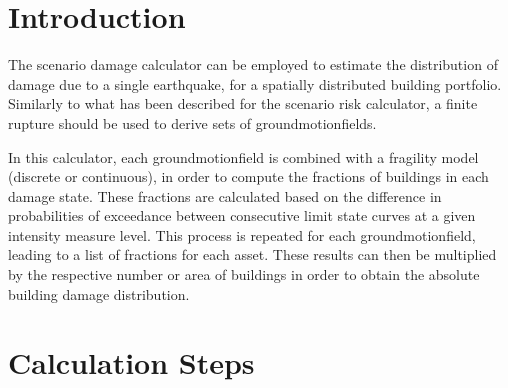 

\section{Introduction}
The scenario damage calculator can be employed to estimate the distribution of damage due to a single earthquake, for a spatially distributed building portfolio. Similarly to what has been described for the scenario risk calculator, a finite \gls{rupture} should be used to derive sets of \glspl{groundmotionfield}. 

In this calculator, each \gls{groundmotionfield} is combined with a \gls{fragility model} (discrete or continuous), in order to compute the fractions of buildings in each damage state. These fractions are calculated based on the difference in probabilities of exceedance between consecutive limit state curves at a given intensity measure level. This process is repeated for each \gls{groundmotionfield}, leading to a list of fractions for each \gls{asset}. These results can then be multiplied by the respective number or area of buildings in order to obtain the absolute building damage distribution.

\section{Calculation Steps}

